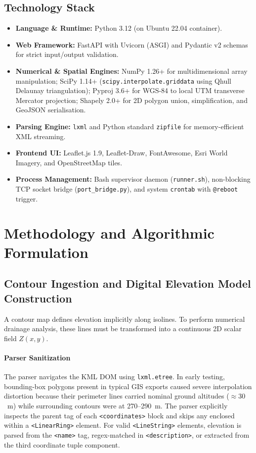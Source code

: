 \documentclass[manuscript,screen,review]{acmart}
\begin{document}
\subsection{Technology Stack}

\begin{itemize}
  \item \textbf{Language \& Runtime:} Python 3.12 (on Ubuntu 22.04 container).
  \item \textbf{Web Framework:} FastAPI with Uvicorn (ASGI) and Pydantic v2 schemas for strict input/output validation.
  \item \textbf{Numerical \& Spatial Engines:} NumPy 1.26+ for multidimensional array manipulation;
    SciPy 1.14+ (\texttt{scipy.interpolate.griddata} using Qhull Delaunay triangulation);
    Pyproj 3.6+ for WGS-84 to local UTM transverse Mercator projection;
    Shapely 2.0+ for 2D polygon union, simplification, and GeoJSON serialisation.
  \item \textbf{Parsing Engine:} \texttt{lxml} and Python standard \texttt{zipfile} for memory-efficient XML streaming.
  \item \textbf{Frontend UI:} Leaflet.js 1.9, Leaflet-Draw, FontAwesome, Esri World Imagery, and OpenStreetMap tiles.
  \item \textbf{Process Management:} Bash supervisor daemon (\texttt{runner.sh}), non-blocking TCP socket bridge (\texttt{port\_bridge.py}),
    and system \texttt{crontab} with \texttt{@reboot} trigger.
\end{itemize}

\section{Methodology and Algorithmic Formulation}
\label{sec:methodology}

\subsection{Contour Ingestion and Digital Elevation Model Construction}

A contour map defines elevation implicitly along isolines. To perform numerical drainage
analysis, these lines must be transformed into a continuous 2D scalar field $Z(x, y)$.

\paragraph{Parser Sanitization}
The parser navigates the KML DOM using \texttt{lxml.etree}. In early testing, bounding-box polygons
present in typical GIS exports caused severe interpolation distortion because their perimeter lines
carried nominal ground altitudes ($\approx 30$~m) while surrounding contours were at 270--290~m.
The parser explicitly inspects the parent tag of each \texttt{<coordinates>} block and skips any
enclosed within a \texttt{<LinearRing>} element. For valid \texttt{<LineString>} elements, elevation
is parsed from the \texttt{<name>} tag, regex-matched in \texttt{<description>}, or extracted from
the third coordinate tuple component.
\end{document}
